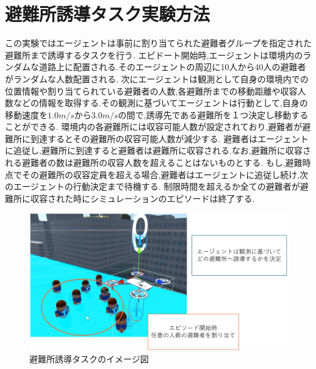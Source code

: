 \section{避難所誘導タスク実験方法}
この実験ではエージェントは事前に割り当てられた避難者グループを指定された避難所まで誘導するタスクを行う.
エピドート開始時,エージェントは環境内のランダムな道路上に配置される.そのエージェントの周辺に10人から40人の避難者がランダムな人数配置される.
次にエージェントは観測として自身の環境内での位置情報や割り当てられている避難者の人数,各避難所までの移動距離や収容人数などの情報を取得する.その観測に基づいてエージェントは行動として,自身の移動速度を$1.0m/s$から$3.0m/s$の間で,誘導先である避難所を１つ決定し移動することができる.
環境内の各避難所には収容可能人数が設定されており,避難者が避難所に到達するとその避難所の収容可能人数が減少する.
避難者はエージェントに追従し,避難所に到達すると避難者は避難所に収容される.なお,避難所に収容される避難者の数は避難所の収容人数を超えることはないものとする.
もし,避難時点でその避難所の収容定員を超える場合,避難者はエージェントに追従し続け,次のエージェントの行動決定まで待機する.
制限時間を超えるか全ての避難者が避難所に収容された時にシミュレーションのエピソードは終了する.
\begin{figure}[H] 
  \centering 
  \includegraphics[width=1.0\textwidth]{Figures/GuidTaskEx.png}
  \caption{避難所誘導タスクのイメージ図}
  \label{fig:01} 
\end{figure}
